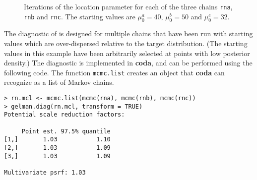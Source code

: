 \documentclass[11pt,a4paper]{article}
\begin{document}
\begin{figure}
\begin{center}
   \vspace{-1.5cm}
  \hspace{0cm} 
  \hspace{0cm} 
\end{center}
\caption{Iterations of the location parameter for each of the three
  chains \texttt{rna}, \texttt{rnb} and \texttt{rnc}. The starting
  values are $\mu_0^a=40$, $\mu_0^b=50$ and $\mu_0^c=32$.}
\label{locit}
\end{figure}

The diagnostic of \citet{gelmrubi92} is designed for multiple chains
that have been run with starting values which are over-dispersed
relative to the target distribution.  (The starting values in this
example have been arbitrarily selected at points with low posterior
density.)  The diagnostic is implemented in \textbf{coda}, and can be
performed using the following code.  The function \verb+mcmc.list+
creates an object that \textbf{coda} can recognize as a list of Markov
chains.


\begin{verbatim}
> rn.mcl <- mcmc.list(mcmc(rna), mcmc(rnb), mcmc(rnc))
> gelman.diag(rn.mcl, transform = TRUE)
Potential scale reduction factors:

     Point est. 97.5% quantile
[1,]       1.03           1.10
[2,]       1.03           1.09
[3,]       1.03           1.09

Multivariate psrf: 1.03
\end{verbatim}
\end{document}
